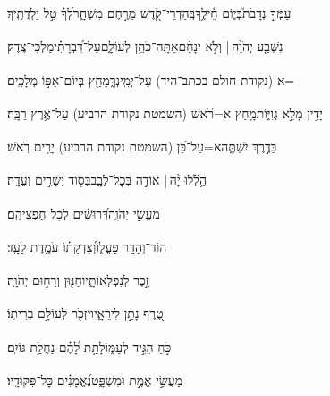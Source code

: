 \documentclass[12pt]{article}
\newcommand{\loc}[1]{\textsuperscript{\locf{#1}}}
\begin{document}
{\loc{ ג}~}‏עַמְּךָ֣ נְדָבֹת֮{\hfill}בְּי֢וֹם חֵ֫ילֶ֥ךָ\newline\hspace*{.5em}בְּֽהַדְרֵי־קֹ֭דֶשׁ מֵרֶ֣חֶם מִשְׁחָ֑ר{\hfill}לְ֝ךָ֗ טַ֣ל יַלְדֻתֶֽיךָ׃\par

{\loc{ ד}~}‏נִשְׁבַּ֤ע יְהֹוָ֨ה |  וְלֹ֥א יִנָּחֵ֗ם{\hfill}אַתָּֽה־כֹהֵ֥ן לְעוֹלָ֑ם\newline\hspace*{.5em}עַל־דִּ֝בְרָתִ֗י{\hfill}מַלְכִּי־צֶֽדֶק׃\par

{\loc{ ה}~}‏=א (נקודת חולם בכתב־היד) עַל־יְמִֽינְךָ֑{\hfill}מָחַ֖ץ בְּיוֹם־אַפּ֣וֹ מְלָכִֽים׃\par

{\loc{ ו}~}‏יָדִ֣ין  מָלֵ֣א גְוִיּ֑וֹת{\hfill}מָ֥חַץ א=רֹ֝אשׁ (השמטת נקודת הרביע) עַל־אֶ֥רֶץ רַבָּֽה׃\par

{\loc{ ז}~}‏ בַּדֶּ֣רֶךְ יִשְׁתֶּ֑ה{\hfill}א=עַל־כֵּ֝ן (השמטת נקודת הרביע) יָרִ֥ים רֹֽאשׁ׃\par\pend
\ledpb
\pstart[\subsection*{\textcolor{red}{פרק קיא}}]\label{פרק קיא}
{\loc{ א}~}‏הַ֥לְﬞלוּ יָ֨הּ | \newline\hspace*{.5em}אוֹדֶ֣ה  בְּכׇל־לֵבָ֑ב{\hfill}בְּס֖וֹד יְשָׁרִ֣ים וְעֵדָֽה׃\par

{\loc{ ב}~}‏ מַעֲשֵׂ֣י יְהֹוָ֑ה{\hfill}דְּ֝רוּשִׁ֗ים לְכׇל־חֶפְצֵיהֶֽם׃\par

{\loc{ ג}~}‏הוֹד־וְהָדָ֥ר פָּעֳל֑וֹ{\hfill}וְ֝צִדְקָת֗וֹ עֹמֶ֥דֶת לָעַֽד׃\par

{\loc{ ד}~}‏זֵ֣כֶר  לְנִפְלְאוֹתָ֑יו{\hfill}חַנּ֖וּן וְרַח֣וּם יְהֹוָֽה׃\par

{\loc{ ה}~}‏טֶ֭רֶף נָתַ֣ן לִירֵאָ֑יו{\hfill}יִזְכֹּ֖ר לְעוֹלָ֣ם בְּרִיתֽוֹ׃\par

{\loc{ ו}~}‏כֹּ֣חַ  הִגִּ֣יד לְעַמּ֑וֹ{\hfill}לָתֵ֥ת לָ֝הֶ֗ם נַחֲלַ֥ת גּוֹיִֽם׃\par

{\loc{ ז}~}‏מַעֲשֵׂ֣י  אֱמֶ֣ת וּמִשְׁפָּ֑ט{\hfill}נֶ֝אֱמָנִ֗ים כׇּל־פִּקּוּדָֽיו׃\par
\end{document}

